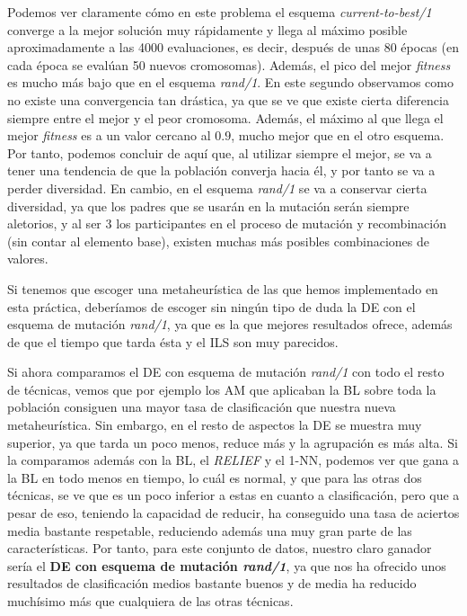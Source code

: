 \documentclass[11pt,a4paper]{article}
\begin{document}
Podemos ver claramente cómo en este problema el esquema \textit{current-to-best/1} converge a la mejor solución muy rápidamente
y llega al máximo posible aproximadamente a las 4000 evaluaciones, es decir, después de unas 80 épocas (en cada época se evalúan
50 nuevos cromosomas). Además, el pico del mejor \textit{fitness} es mucho más bajo que en el esquema \textit{rand/1}. En este
segundo observamos como no existe una convergencia tan drástica, ya que se ve que existe cierta diferencia siempre entre el mejor
y el peor cromosoma. Además, el máximo al que llega el mejor \textit{fitness} es a un valor cercano al $0.9$, mucho mejor
que en el otro esquema. Por tanto, podemos concluir de aquí que, al utilizar siempre el mejor, se va a tener una tendencia de
que la población converja hacia él, y por tanto se va a perder diversidad. En cambio, en el esquema \textit{rand/1} se va a
conservar cierta diversidad, ya que los padres que se usarán en la mutación serán siempre aletorios, y al ser 3 los participantes
en el proceso de mutación y recombinación (sin contar al elemento base), existen muchas más posibles combinaciones de valores.

Si tenemos que escoger una metaheurística de las que hemos implementado en esta práctica, deberíamos de escoger sin ningún tipo
de duda la DE con el esquema de mutación \textit{rand/1}, ya que es la que mejores resultados ofrece, además de que el tiempo
que tarda ésta y el ILS son muy parecidos.

Si ahora comparamos el DE con esquema de mutación \textit{rand/1} con todo el resto de técnicas, vemos que por ejemplo los AM
que aplicaban la BL sobre toda la población consiguen una mayor tasa de clasificación que nuestra nueva metaheurística. Sin embargo,
en el resto de aspectos la DE se muestra muy superior, ya que tarda un poco menos, reduce más y la agrupación es más alta. Si la
comparamos además con la BL, el \textit{RELIEF} y el 1-NN, podemos ver que gana a la BL en todo menos en tiempo, lo cuál es normal,
y que para las otras dos técnicas, se ve que es un poco inferior a estas en cuanto a clasificación, pero que a pesar de eso, teniendo
la capacidad de reducir, ha conseguido una tasa de aciertos media bastante respetable, reduciendo además una muy gran parte de las
características. Por tanto, para este conjunto de datos, nuestro claro ganador sería el \textbf{DE con esquema de mutación
\textit{rand/1}}, ya que nos ha ofrecido unos resultados de clasificación medios bastante buenos y de media ha reducido muchísimo
más que cualquiera de las otras técnicas.
\end{document}
